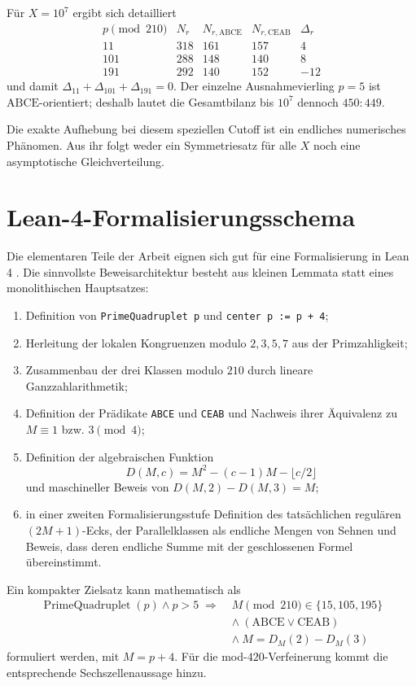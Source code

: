 \documentclass[11pt,a4paper]{article}
\theoremstyle{definition}
\theoremstyle{remark}
\newcommand{\ABCE}{\mathrm{ABCE}}
\newcommand{\CEAB}{\mathrm{CEAB}}
\begin{document}
Für $X=10^7$ ergibt sich detailliert
\[
\begin{array}{c|rrrr}
p\pmod{210}&N_r&N_{r,\ABCE}&N_{r,\CEAB}&\Delta_r\\ \hline
11&318&161&157&4\\
101&288&148&140&8\\
191&292&140&152&-12
\end{array}
\]
und damit $\Delta_{11}+\Delta_{101}+\Delta_{191}=0$. Der einzelne Ausnahmevierling $p=5$ ist $\ABCE$-orientiert; deshalb lautet die Gesamtbilanz bis $10^7$ dennoch $450:449$.

Die exakte Aufhebung bei diesem speziellen Cutoff ist ein endliches numerisches Phänomen. Aus ihr folgt weder ein Symmetriesatz für alle $X$ noch eine asymptotische Gleichverteilung.

\section{Lean-4-Formalisierungsschema}

Die elementaren Teile der Arbeit eignen sich gut für eine Formalisierung in Lean 4 \cite{deMouraUllrich2021}. Die sinnvollste Beweisarchitektur besteht aus kleinen Lemmata statt eines monolithischen Hauptsatzes:

\begin{enumerate}
\item Definition von \texttt{PrimeQuadruplet p} und \texttt{center p := p + 4};
\item Herleitung der lokalen Kongruenzen modulo $2,3,5,7$ aus der Primzahligkeit;
\item Zusammenbau der drei Klassen modulo $210$ durch lineare Ganzzahlarithmetik;
\item Definition der Prädikate \texttt{ABCE} und \texttt{CEAB} und Nachweis ihrer Äquivalenz zu $M\equiv1$ bzw. $3\pmod4$;
\item Definition der algebraischen Funktion
\[
D(M,c)=M^2-(c-1)M-\lfloor c/2\rfloor
\]
und maschineller Beweis von $D(M,2)-D(M,3)=M$;
\item in einer zweiten Formalisierungsstufe Definition des tatsächlichen regulären $(2M+1)$-Ecks, der Parallelklassen als endliche Mengen von Sehnen und Beweis, dass deren endliche Summe mit der geschlossenen Formel übereinstimmt.
\end{enumerate}

Ein kompakter Zielsatz kann mathematisch als
\begin{align*}
\operatorname{PrimeQuadruplet}(p)\land p>5
\;\Longrightarrow\;&
M\pmod{210}\in\{15,105,195\}\\
&\land\ (\ABCE\lor\CEAB)\\
&\land\ M=D_M(2)-D_M(3)
\end{align*}
formuliert werden, mit $M=p+4$. Für die mod-$420$-Verfeinerung kommt die entsprechende Sechszellenaussage hinzu.
\end{document}
